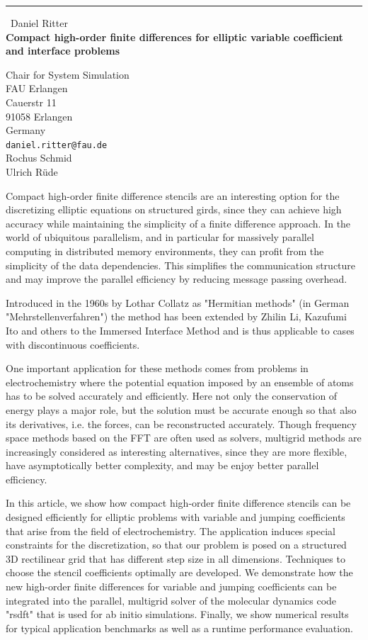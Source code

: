 \documentclass{report}
\begin{document}
\begin{center}
\rule{6in}{1pt} \
{\large Daniel Ritter \\
{\bf Compact high-order finite differences for elliptic variable coefficient and interface problems}}

Chair for System Simulation \\ FAU Erlangen \\ Cauerstr 11 \\ 91058 Erlangen \\ Germany
\\
{\tt daniel.ritter@fau.de}\\
Rochus Schmid\\
Ulrich R\"ude\end{center}

Compact high-order finite difference stencils are an interesting option
for the discretizing elliptic equations on structured girds, since they
can achieve high accuracy while maintaining the simplicity of a finite
difference approach. In the world of ubiquitous parallelism, and in
particular for massively parallel computing in distributed memory
environments, they can profit from the simplicity of the data
dependencies. This simplifies the communication structure and may improve
the parallel efficiency by reducing message passing overhead.

Introduced in the 1960s by Lothar Collatz as "Hermitian methods" (in
German "Mehrstellenverfahren") the method has been extended by Zhilin Li,
Kazufumi Ito and others to the Immersed Interface Method and is thus
applicable to cases with discontinuous coefficients.

One important application for these methods comes from problems in
electrochemistry where the potential equation imposed by an ensemble of
atoms has to be solved accurately and efficiently. Here not only the
conservation of energy plays a major role, but the solution must be
accurate enough so that also its derivatives, i.e. the forces, can be
reconstructed accurately. Though frequency space methods based on the FFT
are often used as solvers, multigrid methods are increasingly considered
as interesting alternatives, since they are more flexible, have
asymptotically better complexity, and may be enjoy better parallel
efficiency.

In this article, we show how compact high-order finite difference
stencils can be designed efficiently for elliptic problems with variable
and jumping coefficients that arise from the field of electrochemistry.
The application induces special constraints for the discretization, so
that our problem is posed on a structured 3D rectilinear grid that has
different step size in all dimensions. Techniques to choose the stencil
coefficients optimally are developed. We demonstrate how the new
high-order finite differences for variable and jumping coefficients can
be integrated into the parallel, multigrid solver of the molecular
dynamics code "rsdft" that is used for ab initio simulations. Finally, we
show numerical results for typical application benchmarks as well as a
runtime performance evaluation.
\end{document}
